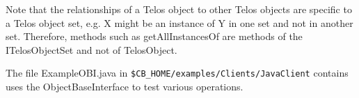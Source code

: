 Note that the relationships of a Telos object to other Telos objects
are specific to a Telos object set, e.g. X might be an instance of Y
in one set and not in another set. Therefore, methods such as {\ttfamily getAllInstancesOf}
are methods of the ITelosObjectSet and not of TelosObject.

The file ExampleOBI.java in \verb+$CB_HOME/examples/Clients/JavaClient+
contains uses the {\ttfamily ObjectBaseInterface} to test various operations.

